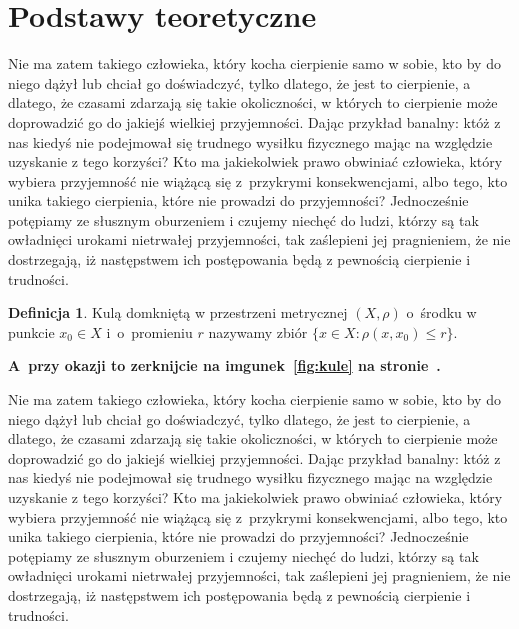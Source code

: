 \documentclass[12pt]{mwbk}
\let\leq\leqslant\let\le\leq\let\geq\geqslant\let\ge\geq
\theoremstyle{plain}
\theoremstyle{definition}
\newtheorem{defi}{Definicja}[chapter]
\theoremstyle{remark}
\begin{document}
\section{Podstawy teoretyczne}
Nie ma zatem takiego człowieka, który kocha cierpienie samo w sobie, 
kto by do niego dążył lub chciał go doświadczyć, tylko dlatego, że
jest to cierpienie, a dlatego, że czasami zdarzają się takie 
okoliczności, w których to cierpienie może doprowadzić 
go do jakiejś wielkiej przyjemności. 
Dając przykład banalny: któż z nas kiedyś nie podejmował 
się trudnego wysiłku fizycznego mając na względzie 
uzyskanie z tego korzyści? 
Kto ma jakiekolwiek prawo obwiniać człowieka, 
który wybiera przyjemność nie wiążącą się z~przykrymi 
konsekwencjami, albo tego, kto unika takiego cierpienia, 
które nie prowadzi do przyjemności? 
Jednocześnie potępiamy ze słusznym oburzeniem i czujemy 
niechęć do ludzi, którzy są tak owładnięci urokami nietrwałej 
przyjemności, tak zaślepieni jej pragnieniem, 
że nie dostrzegają, iż następstwem ich 
postępowania będą z pewnością cierpienie i trudności.

\begin{defi}
	Kulą domkniętą w przestrzeni metrycznej $(X,\rho)$ 
	o~środku w punkcie $x_0\in X$ i~o~promieniu $r$
	nazywamy zbiór $\{x\in X\colon \rho(x,x_0) \leq r\}$. 
\end{defi}

\textbf{
A~przy okazji to zerknijcie na imgunek~\ref{fig:kule} na
stronie~\pageref{fig:kule}.}


Nie ma zatem takiego człowieka, który kocha cierpienie samo w sobie, 
kto by do niego dążył lub chciał go doświadczyć, tylko dlatego, że
jest to cierpienie, a dlatego, że czasami zdarzają się takie 
okoliczności, w których to cierpienie może doprowadzić 
go do jakiejś wielkiej przyjemności. 
Dając przykład banalny: któż z nas kiedyś nie podejmował 
się trudnego wysiłku fizycznego mając na względzie 
uzyskanie z tego korzyści? 
Kto ma jakiekolwiek prawo obwiniać człowieka, 
który wybiera przyjemność nie wiążącą się z~przykrymi 
konsekwencjami, albo tego, kto unika takiego cierpienia, 
które nie prowadzi do przyjemności? 
Jednocześnie potępiamy ze słusznym oburzeniem i czujemy 
niechęć do ludzi, którzy są tak owładnięci urokami nietrwałej 
przyjemności, tak zaślepieni jej pragnieniem, 
że nie dostrzegają, iż następstwem ich 
postępowania będą z pewnością cierpienie i trudności.
\end{document}
